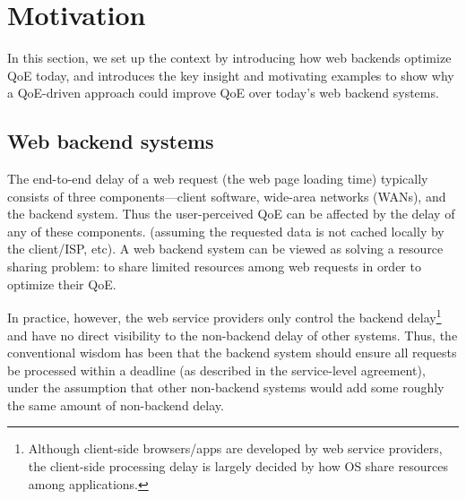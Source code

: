 
\section{Motivation}
In this section, we set up the context by introducing how web backends optimize QoE today, and introduces the key insight and motivating examples to show why a QoE-driven approach could improve QoE over today's web backend systems.

\subsection{Web backend systems}
The end-to-end delay of a web request (\ie the web page loading time) typically consists of three components---client software, wide-area networks (WANs), and the backend system.
Thus the user-perceived QoE can be affected by the delay of any of these components.
(assuming the requested data is not cached locally by the client/ISP, etc). 
A web backend system can be viewed as solving a resource sharing problem: to share limited resources among web requests in order to optimize their QoE.

In practice, however, the web service providers only control the backend delay\footnote{Although client-side browsers/apps are developed by web service providers, the client-side processing delay is largely decided by how OS share resources among applications.} and have no direct visibility to the non-backend delay of other systems. 
Thus, the conventional wisdom has been that the backend system should ensure all requests be processed within a deadline (\eg as described in the service-level agreement), under the assumption that other non-backend systems would add some roughly the same amount of non-backend delay.

